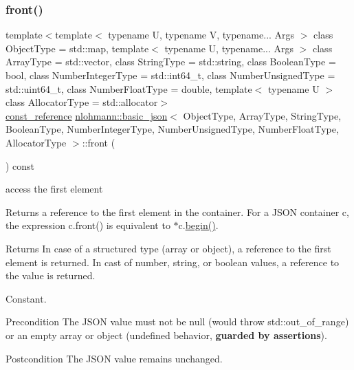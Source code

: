 \subsubsection{\texorpdfstring{front()}{front()}\hspace{0.1cm}{\footnotesize\ttfamily [2/2]}}
{\footnotesize\ttfamily template$<$template$<$ typename U, typename V, typename... Args $>$ class Object\+Type = std\+::map, template$<$ typename U, typename... Args $>$ class Array\+Type = std\+::vector, class String\+Type  = std\+::string, class Boolean\+Type  = bool, class Number\+Integer\+Type  = std\+::int64\+\_\+t, class Number\+Unsigned\+Type  = std\+::uint64\+\_\+t, class Number\+Float\+Type  = double, template$<$ typename U $>$ class Allocator\+Type = std\+::allocator$>$ \\
\hyperlink{classnlohmann_1_1basic__json_af677a29b0e66edc9f66e5167e4667071}{const\+\_\+reference} \hyperlink{classnlohmann_1_1basic__json}{nlohmann\+::basic\+\_\+json}$<$ Object\+Type, Array\+Type, String\+Type, Boolean\+Type, Number\+Integer\+Type, Number\+Unsigned\+Type, Number\+Float\+Type, Allocator\+Type $>$\+::front (\begin{DoxyParamCaption}{ }\end{DoxyParamCaption}) const\hspace{0.3cm}{\ttfamily [inline]}}



access the first element 

Returns a reference to the first element in the container. For a J\+S\+ON container {\ttfamily c}, the expression {\ttfamily c.\+front()} is equivalent to {\ttfamily $\ast$c.\hyperlink{classnlohmann_1_1basic__json_ad4e381c54039607be08d7af41a1f6ad1}{begin()}}.

\begin{DoxyReturn}{Returns}
In case of a structured type (array or object), a reference to the first element is returned. In cast of number, string, or boolean values, a reference to the value is returned.
\end{DoxyReturn}
Constant.

\begin{DoxyPrecond}{Precondition}
The J\+S\+ON value must not be {\ttfamily null} (would throw {\ttfamily std\+::out\+\_\+of\+\_\+range}) or an empty array or object (undefined behavior, {\bfseries guarded by assertions}). 
\end{DoxyPrecond}
\begin{DoxyPostcond}{Postcondition}
The J\+S\+ON value remains unchanged.
\end{DoxyPostcond}

